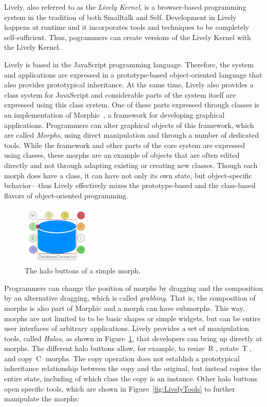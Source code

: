 Lively, also referred to as the \emph{Lively Kernel}, is a browser-based programming system in the tradition of both Smalltalk and Self.
Development in Lively happens at runtime and it incorporates tools and techniques to be completely self-sufficient.
Thus, pogrammers can create versions of the Lively Kernel with the Lively Kernel.

Lively is based in the JavaScript programming language.
Therefore, the system and applications are expressed in a prototype-based object-oriented language that also provides prototypical inheritance.
At the same time, Lively also provides a class system for JavaScript and considerable parts of the system itself are expressed using this class system.
One of these parts expressed through classes is an implementation of Morphic~\cite{Maloney1995Mor}, a framework for developing graphical applications.
Programmers can alter graphical objects of this framework, which are called \emph{Morphs}, using direct manipulation and through a number of dedicated tools.
While the framework and other parts of the core system are expressed using classes, these morphs are an example of objects that are often edited directly and not through adapting existing or creating new classes.
Though each morph does have a class, it can have not only its own state, but object-specific behavior---thus Lively effectively mixes the prototype-based and the class-based flavors of object-oriented programming.

\begin{figure}[h]
    \centering
    \includegraphics[width=0.3\textwidth]{figures/halos.pdf}
    \caption{The halo buttons of a simple morph.}
    \label{fig:Halos}
\end{figure}

Programmers can change the position of morphs by dragging and the composition by an alternative dragging, which is called \emph{grabbing}.
That is, the composition of morphs is also part of Morphic and a morph can have submorphs.
This way, morphs are not limited to to be basic shapes or simple widgets, but can be entire user interfaces of arbitrary applications.
Lively provides a set of manipulation tools, called \emph{Halos}, as shown in Figure~\ref{fig:Halos}, that developers can bring up directly at morphs.
The different halo buttons allow, for example, to resize~\textcircled{R}, rotate~\textcircled{T}, and copy~\textcircled{C} morphs.
The copy operation does not establish a prototypical inheritance relationship between the copy and the original, but instead copies the entire state, including of which class the copy is an instance.
Other halo buttons open specific tools, which are shown in Figure~\ref{fig:LivelyTools} to further manipulate the morphs:

